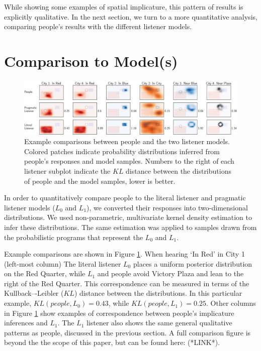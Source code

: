 \documentclass[10pt,letterpaper]{article}
\begin{document}
While showing some examples of spatial implicature, this pattern of results is explicitly qualitative. In the next section, we turn to a more quantitative analysis, comparing people's results with the different listener models. 

\section{Comparison to Model(s)}

\begin{figure}[!t]
\center
\includegraphics[width=\textwidth]{figures/Figure4.pdf}
\caption{Example comparisons between people and the two listener models. Colored patches indicate probability distributions inferred from people's responses and model samples. Numbers to the right of each listener subplot indicate the $KL$ distance between the distributions of people and the model samples, lower is better.}
\label{fig:modelExamples}
\end{figure}

In order to quantitatively compare people to the literal listener and pragmatic listener models ($L_0$ and $L_1$), we converted their responses into two-dimensional distributions. We used non-parametric, multivariate kernel density estimation to infer these distributions. The same estimation was applied to samples drawn from the probabilistic programs that represent the $L_0$ and $L_1$. 

Example comparisons are shown in Figure \ref{fig:modelExamples}. When hearing `In Red' in City 1 (left-most column) The literal listener $L_0$ places a uniform posterior distribution on the Red Quarter, while $L_1$ and people avoid Victory Plaza and lean to the right of the Red Quarter. This correspondence can be measured in terms of the Kullback–-Leibler ($KL$) distance between the distributions. In this particular example, $KL(people, L_0) = 0.43$, while $KL(people, L_1) = 0.25$. Other columns in Figure \ref{fig:modelExamples} show examples of correspondence between people's implicature inferences and $L_1$. The $L_1$ listener also shows the same general qualitative patterns as people, discussed in the previous section. A full comparison figure is beyond the the scope of this paper, but can be found here: (*LINK*).
\end{document}

